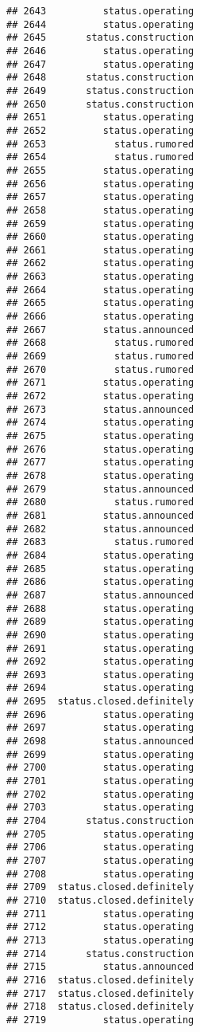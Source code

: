 \documentclass[
]{article}
\begin{document}
\begin{verbatim}
## 2643          status.operating
## 2644          status.operating
## 2645       status.construction
## 2646          status.operating
## 2647          status.operating
## 2648       status.construction
## 2649       status.construction
## 2650       status.construction
## 2651          status.operating
## 2652          status.operating
## 2653            status.rumored
## 2654            status.rumored
## 2655          status.operating
## 2656          status.operating
## 2657          status.operating
## 2658          status.operating
## 2659          status.operating
## 2660          status.operating
## 2661          status.operating
## 2662          status.operating
## 2663          status.operating
## 2664          status.operating
## 2665          status.operating
## 2666          status.operating
## 2667          status.announced
## 2668            status.rumored
## 2669            status.rumored
## 2670            status.rumored
## 2671          status.operating
## 2672          status.operating
## 2673          status.announced
## 2674          status.operating
## 2675          status.operating
## 2676          status.operating
## 2677          status.operating
## 2678          status.operating
## 2679          status.announced
## 2680            status.rumored
## 2681          status.announced
## 2682          status.announced
## 2683            status.rumored
## 2684          status.operating
## 2685          status.operating
## 2686          status.operating
## 2687          status.announced
## 2688          status.operating
## 2689          status.operating
## 2690          status.operating
## 2691          status.operating
## 2692          status.operating
## 2693          status.operating
## 2694          status.operating
## 2695  status.closed.definitely
## 2696          status.operating
## 2697          status.operating
## 2698          status.announced
## 2699          status.operating
## 2700          status.operating
## 2701          status.operating
## 2702          status.operating
## 2703          status.operating
## 2704       status.construction
## 2705          status.operating
## 2706          status.operating
## 2707          status.operating
## 2708          status.operating
## 2709  status.closed.definitely
## 2710  status.closed.definitely
## 2711          status.operating
## 2712          status.operating
## 2713          status.operating
## 2714       status.construction
## 2715          status.announced
## 2716  status.closed.definitely
## 2717  status.closed.definitely
## 2718  status.closed.definitely
## 2719          status.operating

\end{verbatim}
\end{document}
